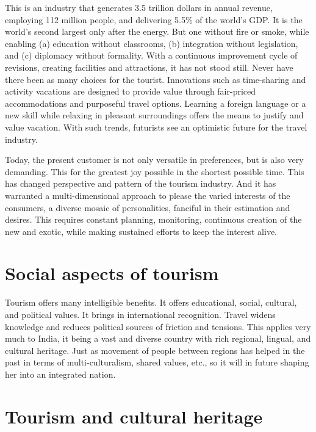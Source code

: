 This is an industry that generates 3.5 trillion dollars in annual revenue, employing 112 million people, and delivering 5.5\% of the world's GDP. It is the world's second largest only after the energy. But one without fire or smoke, while enabling (a) education without classrooms, (b) integration without legislation, and (c) diplomacy without formality. With a continuous improvement cycle of revisions, creating facilities and attractions, it has not stood still. Never have there been as many choices for the tourist. Innovations such as time-sharing and activity vacations are designed to provide value through fair-priced accommodations and purposeful travel options. Learning a foreign language or a new skill while relaxing in pleasant surroundings offers the means to justify and value vacation. With such trends, futurists see an optimistic future for the travel industry.

Today, the present customer is not only versatile in preferences, but is also very demanding. This for the greatest joy possible in the shortest possible time. This has changed perspective and pattern of the tourism industry. And it has warranted a multi-dimensional approach to please the varied interests of the consumers, a diverse mosaic of personalities, fanciful in their estimation and desires. This requires constant planning, monitoring, continuous creation of the new and exotic, while making sustained efforts to keep the interest alive.


\section{Social aspects of tourism} %
\label{sec:sat}

Tourism offers many intelligible benefits. It offers educational, social, cultural, and political values. It brings in international recognition. Travel widens knowledge and reduces political sources of friction and tensions. This applies very much to India, it being a vast and diverse country with rich regional, lingual, and cultural heritage. Just as movement of people between regions has helped in the past in terms of multi-culturalism, shared values, etc., so it will in future shaping her into an integrated nation.


\section{Tourism and cultural heritage} %
\label{sec:tch}

